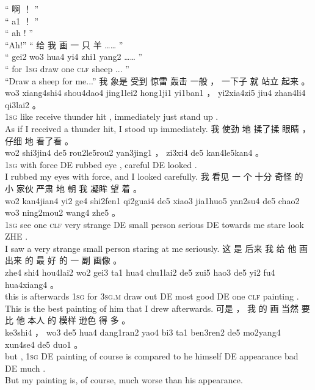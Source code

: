\documentclass[UTF8]{ctexart}
\begin{document}
\begin{exe}
\ex
\glll
“ 啊 ！ ”
\\
“ a1 ！ ”
\\
`` ah ! ''
\\
\trans ``Ah!''
\ex
\glll
“ 给 我 画 一 只 羊 …… ”
\\
“ gei2 wo3 hua4 yi4 zhi1 yang2 …… ”
\\
`` for \textsc{1sg} draw one \textsc{clf} sheep ... ''
\\
\trans ``Draw a sheep for me...''
\ex
\glll
我 象是 受到 惊雷 轰击 一般 ， 一下子 就 站立 起来 。
\\
wo3 xiang4shi4 shou4dao4 jing1lei2 hong1ji1 yi1ban1 ， yi2xia4zi5 jiu4 zhan4li4 qi3lai2 。
\\
\textsc{1sg} like receive thunder hit {} , immediately just stand up .
\\
\trans As if I received a thunder hit, I stood up immediately. 
\ex
\glll
我 使劲 地 揉了揉 眼睛 ， 仔细 地 看了看 。
\\
wo2 shi3jin4 de5 rou2le5rou2 yan3jing1 ， zi3xi4 de5 kan4le5kan4 。
\\
\textsc{1sg} {with force} DE rubbed eye , careful DE looked .
\\
\trans I rubbed my eyes with force, and I looked carefully. 
\ex
\glll
我 看见 一 个 十分 奇怪 的 小 家伙 严肃 地 朝 我 凝眸 望 着 。
\\
wo2 kan4jian4 yi2 ge4 shi2fen1 qi2guai4 de5 xiao3 jia1huo5 yan2su4 de5 chao2 wo3 ning2mou2 wang4 zhe5 。
\\
\textsc{1sg} see one \textsc{clf} very strange DE small person serious DE towards me stare look ZHE .
\\
\trans I saw a very strange small person staring at me seriously.
\ex
\glll
这 是 后来 我 给 他 画 出来 的 最 好 的 一 副 画像 。
\\
zhe4 shi4 hou4lai2 wo2 gei3 ta1 hua4 chu1lai2 de5 zui5 hao3 de5 yi2 fu4 hua4xiang4 。
\\
this is afterwards \textsc{1sg} for \textsc{3sg.m} draw out DE most good DE one \textsc{clf} painting .
\\
\trans This is the best painting of him that I drew afterwards. 
\ex
\glll
可是 ， 我 的 画 当然 要 比 他 本人 的 模样 逊色 得 多 。
\\
ke3shi4 ， wo3 de5 hua4 dang1ran2 yao4 bi3 ta1 ben3ren2 de5 mo2yang4 xun4se4 de5 duo1 。
\\
but , \textsc{1sg} DE painting {of course} is {compared to} he himself DE appearance bad DE much .
\\
\trans But my painting is, of course, much worse than his appearance.

\end{exe}
\end{document}
